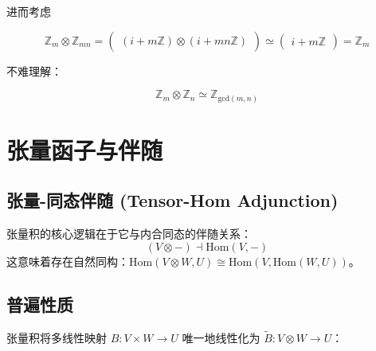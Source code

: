 \documentclass[10pt, openany]{book}
\begin{document}
进而考虑

$$
\mathbb Z_m \otimes \mathbb Z_{mn}
= \begin{pmatrix}(i + m\mathbb Z) \otimes (i + mn\mathbb Z) \end{pmatrix}
\simeq \begin{pmatrix}i + m\mathbb Z\end{pmatrix}
= \mathbb Z_m
$$


不难理解：

$$
\mathbb Z_m \otimes \mathbb Z_n \simeq \mathbb Z_{\text{gcd}(m,n)}​
$$

\begin{center}
\end{center}

\chapter{张量函子与伴随}

\section{张量-同态伴随 (Tensor-Hom Adjunction)}
张量积的核心逻辑在于它与内合同态的伴随关系：
\begin{equation}
(V \otimes -) \dashv \mathrm{Hom}(V, -)
\end{equation}
这意味着存在自然同构：$\mathrm{Hom}(V \otimes W, U) \cong \mathrm{Hom}(V, \mathrm{Hom}(W, U))$。

\section{普遍性质}
张量积将多线性映射 $B: V \times W \to U$ 唯一地线性化为 $\tilde{B}: V \otimes W \to U$：
\begin{center}
\end{center}
\end{document}
